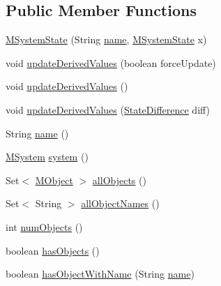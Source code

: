 \subsection*{Public Member Functions}
\begin{DoxyCompactItemize}
\item 
\hyperlink{classorg_1_1tzi_1_1use_1_1uml_1_1sys_1_1_m_system_state_a7b7509a25cd71dd15a80bd9a1bc30956}{M\-System\-State} (String \hyperlink{classorg_1_1tzi_1_1use_1_1uml_1_1sys_1_1_m_system_state_a83de7299fed54e980318e06d26dc9976}{name}, \hyperlink{classorg_1_1tzi_1_1use_1_1uml_1_1sys_1_1_m_system_state}{M\-System\-State} x)
\item 
void \hyperlink{classorg_1_1tzi_1_1use_1_1uml_1_1sys_1_1_m_system_state_a440b5b9bd726a456a467942b559edd36}{update\-Derived\-Values} (boolean force\-Update)
\item 
void \hyperlink{classorg_1_1tzi_1_1use_1_1uml_1_1sys_1_1_m_system_state_afec6af4a728928b68d9937d17adb8d84}{update\-Derived\-Values} ()
\item 
void \hyperlink{classorg_1_1tzi_1_1use_1_1uml_1_1sys_1_1_m_system_state_af7d8c5b4bd75b69c5b25daa1018dc7d6}{update\-Derived\-Values} (\hyperlink{classorg_1_1tzi_1_1use_1_1util_1_1soil_1_1_state_difference}{State\-Difference} diff)
\item 
String \hyperlink{classorg_1_1tzi_1_1use_1_1uml_1_1sys_1_1_m_system_state_a83de7299fed54e980318e06d26dc9976}{name} ()
\item 
\hyperlink{classorg_1_1tzi_1_1use_1_1uml_1_1sys_1_1_m_system}{M\-System} \hyperlink{classorg_1_1tzi_1_1use_1_1uml_1_1sys_1_1_m_system_state_a1f20ea3404d95cb17abe3056735e0f99}{system} ()
\item 
Set$<$ \hyperlink{interfaceorg_1_1tzi_1_1use_1_1uml_1_1sys_1_1_m_object}{M\-Object} $>$ \hyperlink{classorg_1_1tzi_1_1use_1_1uml_1_1sys_1_1_m_system_state_a044958c3e1856b67b87af85fe1f1ad52}{all\-Objects} ()
\item 
Set$<$ String $>$ \hyperlink{classorg_1_1tzi_1_1use_1_1uml_1_1sys_1_1_m_system_state_a5b807ac8156b4033bc358a9844004292}{all\-Object\-Names} ()
\item 
int \hyperlink{classorg_1_1tzi_1_1use_1_1uml_1_1sys_1_1_m_system_state_ac0db37818c0957e0e47f55fb78c25f44}{num\-Objects} ()
\item 
boolean \hyperlink{classorg_1_1tzi_1_1use_1_1uml_1_1sys_1_1_m_system_state_ae0a808c261f267bdbecc49699fe4378b}{has\-Objects} ()
\item 
boolean \hyperlink{classorg_1_1tzi_1_1use_1_1uml_1_1sys_1_1_m_system_state_afdf102d319a34f99f18c9d8c9583b274}{has\-Object\-With\-Name} (String \hyperlink{classorg_1_1tzi_1_1use_1_1uml_1_1sys_1_1_m_system_state_a83de7299fed54e980318e06d26dc9976}{name})

\end{DoxyCompactItemize}
